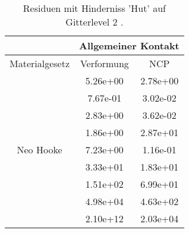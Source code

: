 \begin{table} 
\centering 
\begin{tabular}{c|cc|} 
\cline{2-3} 
 & \multicolumn{2}{|c|}{Allgemeiner Kontakt} \\ 
\hline 
\multicolumn{1}{|c|}{Materialgesetz} & \multicolumn{1}{c|}{Verformung} & \multicolumn{1}{c|}{NCP} \\ 
\hline 
\multicolumn{1}{|c|}{\multirow{9}{*}{Neo Hooke}} &\multicolumn{1}{|c|}{  5.26e+00} & \multicolumn{1}{|c|}{  2.78e+00} \\ 
\multicolumn{1}{|c|}{} & \multicolumn{1}{|c|}{  7.67e-01} & \multicolumn{1}{|c|}{  3.02e-02} \\ 
\multicolumn{1}{|c|}{} & \multicolumn{1}{|c|}{  2.83e+00} & \multicolumn{1}{|c|}{  3.62e-02} \\ 
\multicolumn{1}{|c|}{} & \multicolumn{1}{|c|}{  1.86e+00} & \multicolumn{1}{|c|}{  2.87e+01} \\ 
\multicolumn{1}{|c|}{} & \multicolumn{1}{|c|}{  7.23e+00} & \multicolumn{1}{|c|}{  1.16e-01} \\ 
\multicolumn{1}{|c|}{} & \multicolumn{1}{|c|}{  3.33e+01} & \multicolumn{1}{|c|}{  1.83e+01} \\ 
\multicolumn{1}{|c|}{} & \multicolumn{1}{|c|}{  1.51e+02} & \multicolumn{1}{|c|}{  6.99e+01} \\ 
\multicolumn{1}{|c|}{} & \multicolumn{1}{|c|}{  4.98e+04} & \multicolumn{1}{|c|}{  4.63e+02} \\ 
\multicolumn{1}{|c|}{} & \multicolumn{1}{|c|}{  2.10e+12} & \multicolumn{1}{|c|}{  2.03e+04} \\ 
\hline 
\end{tabular}\caption{Residuen mit Hinderniss 'Hut' auf Gitterlevel 2 .}\label{tab:Residuum_Hut_level2}
\end{table} 
